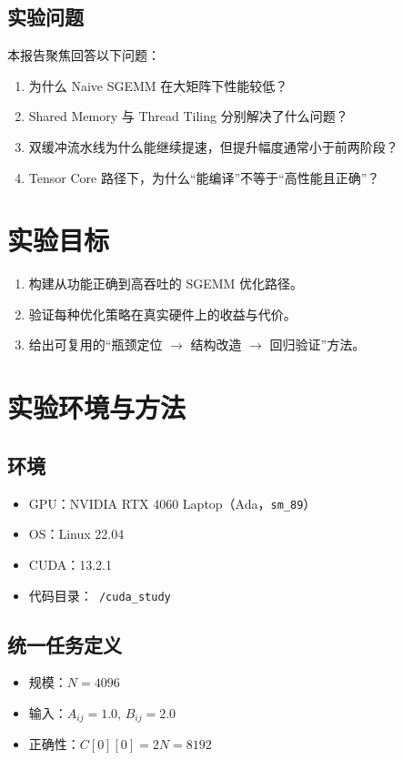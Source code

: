 \documentclass[12pt,a4paper]{ctexart}
\begin{document}
\subsection{实验问题}
本报告聚焦回答以下问题：
\begin{enumerate}[leftmargin=2em,label=Q\arabic*.]
  \item 为什么 Naive SGEMM 在大矩阵下性能较低？
  \item Shared Memory 与 Thread Tiling 分别解决了什么问题？
  \item 双缓冲流水线为什么能继续提速，但提升幅度通常小于前两阶段？
  \item Tensor Core 路径下，为什么“能编译”不等于“高性能且正确”？
\end{enumerate}

\section{实验目标}
\begin{enumerate}[leftmargin=2em]
  \item 构建从功能正确到高吞吐的 SGEMM 优化路径。
  \item 验证每种优化策略在真实硬件上的收益与代价。
  \item 给出可复用的“瓶颈定位 $\rightarrow$ 结构改造 $\rightarrow$ 回归验证”方法。
\end{enumerate}

\section{实验环境与方法}
\subsection{环境}
\begin{itemize}[leftmargin=2em]
  \item GPU：NVIDIA RTX 4060 Laptop（Ada，\texttt{sm\_89}）
  \item OS：Linux 22.04
  \item CUDA：13.2.1
  \item 代码目录：\texttt{~/cuda\_study}
\end{itemize}

\subsection{统一任务定义}
\begin{itemize}[leftmargin=2em]
  \item 规模：\(N=4096\)
  \item 输入：\(A_{ij}=1.0\), \(B_{ij}=2.0\)
  \item 正确性：\(C[0][0]=2N=8192\)
\end{itemize}
\end{document}
